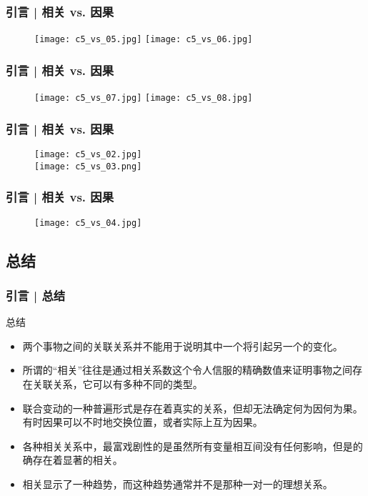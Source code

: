 \begin{frame}
  \frametitle{引言 | 相关 vs. 因果}
  \begin{figure}
    \centering
    \texttt{[image: c5\_vs\_05.jpg]}
    \texttt{[image: c5\_vs\_06.jpg]}
  \end{figure}
\end{frame}

\begin{frame}
  \frametitle{引言 | 相关 vs. 因果}
  \begin{figure}
    \centering
    \texttt{[image: c5\_vs\_07.jpg]}
    \texttt{[image: c5\_vs\_08.jpg]}
  \end{figure}
\end{frame}

\begin{frame}
  \frametitle{引言 | 相关 vs. 因果}
  \begin{figure}
    \centering
    \texttt{[image: c5\_vs\_02.jpg]}\\
    \texttt{[image: c5\_vs\_03.png]}
  \end{figure}
\end{frame}

\begin{frame}
  \frametitle{引言 | 相关 vs. 因果}
  \begin{figure}
    \centering
    \texttt{[image: c5\_vs\_04.jpg]}
  \end{figure}
\end{frame}

\subsection{总结}
\begin{frame}
  \frametitle{引言 | 总结}
  \begin{block}{总结}
    \begin{itemize}
      \item \alert{两个事物之间的关联关系并不能用于说明其中一个将引起另一个的变化。}
      \item 所谓的“相关”往往是通过相关系数这个令人信服的精确数值来证明事物之间存在关联关系，它可以有多种不同的类型。
      \item 联合变动的一种普遍形式是存在着真实的关系，但却无法确定何为因何为果。有时因果可以不时地交换位置，或者实际上互为因果。
      \item 各种相关关系中，最富戏剧性的是虽然所有变量相互间没有任何影响，但是的确存在着显著的相关。
      \item 相关显示了一种趋势，而这种趋势通常并不是那种一对一的理想关系。
    \end{itemize}
  \end{block}
\end{frame}

